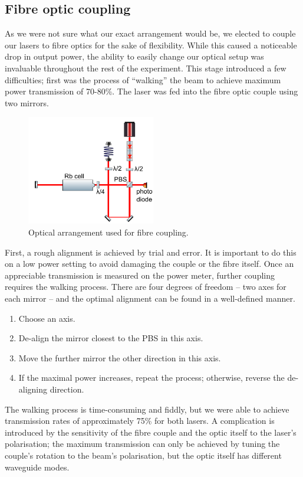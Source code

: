 \documentclass[11pt,twoside,a4paper]{article}
\begin{document}
\subsection{Fibre optic coupling}
As we were not sure what our exact arrangement would be, we elected to couple our lasers to fibre optics for the sake of flexibility. While this caused a noticeable drop in output power, the ability
to easily change our optical setup was invaluable throughout the rest of the experiment. This stage introduced a few difficulties; first was the process of ``walking'' the beam to achieve maximum power
transmission of 70-80\%. The laser was fed into the fibre optic couple using two mirrors.
\begin{figure}[h]
    \centering
    \includegraphics[width=0.5\textwidth]{images/laser-setup}
    \caption{Optical arrangement used for fibre coupling.}
\end{figure}

First, a rough alignment is achieved by trial and error. It is important to do this on a low power setting to avoid damaging the couple or the fibre itself. Once an appreciable transmission is measured
on the power meter, further coupling requires the walking process. There are four degrees of freedom -- two axes for each mirror -- and the optimal alignment can be found in a well-defined manner.
\begin{enumerate}
    \item Choose an axis.
    \item De-align the mirror closest to the PBS in this axis.
    \item Move the further mirror the other direction in this axis.
    \item If the maximal power increases, repeat the process; otherwise, reverse the de-aligning direction.
\end{enumerate}
The walking process is time-consuming and fiddly, but we were able to achieve transmission rates of approximately 75\% for both lasers. A complication is introduced by the sensitivity of the fibre
couple and the optic itself to the laser's polarisation; the maximum transmission can only be achieved by tuning the couple's rotation to the beam's polarisation, but the optic itself has different
waveguide modes.
\end{document}
